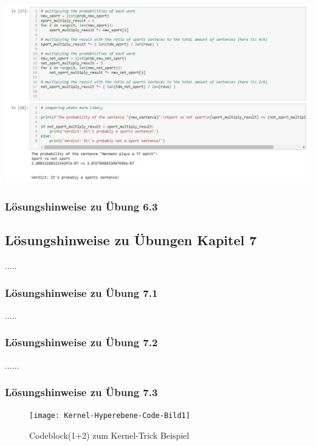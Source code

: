 \documentclass[12pt]{article}
\begin{document}
\begin{center} 
\includegraphics[width=1.1\textwidth]{Naive-Bayes-Ueb62_Hinweis}
\end{center}

\subsubsection{Lösungshinweise zu Übung 6.3}


\newpage

\subsection{Lösungshinweise zu Übungen Kapitel 7}
.....\\
\subsubsection{Lösungshinweise zu Übung 7.1}
.....\\
\subsubsection{Lösungshinweise zu Übung 7.2} 
...... \\[0.8cm]
\subsubsection{Lösungshinweise zu Übung 7.3}

\begin{figure}[htp]
  \centering
  \hspace*{-0.5cm} 
  \texttt{[image: Kernel-Hyperebene-Code-Bild1]}
  \caption{Codeblock(1+2) zum Kernel-Trick Beispiel}
  \label{fig:SVM_Ebenen}
\end{figure}
\end{document}
